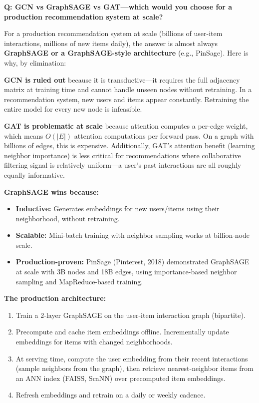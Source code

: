 \begin{interviewq}
\textbf{Q: GCN vs GraphSAGE vs GAT---which would you choose for a production recommendation system at scale?}

 \quad {} \quad \badgefreq{\freqmed}

\stronganswer

For a production recommendation system at scale (billions of user-item interactions, millions of new items daily), the answer is almost always \textbf{GraphSAGE or a GraphSAGE-style architecture} (e.g., PinSage). Here is why, by elimination:

\textbf{GCN is ruled out} because it is transductive---it requires the full adjacency matrix at training time and cannot handle unseen nodes without retraining. In a recommendation system, new users and items appear constantly. Retraining the entire model for every new node is infeasible.

\textbf{GAT is problematic at scale} because attention computes a per-edge weight, which means $O(|E|)$ attention computations per forward pass. On a graph with billions of edges, this is expensive. Additionally, GAT's attention benefit (learning neighbor importance) is less critical for recommendations where collaborative filtering signal is relatively uniform---a user's past interactions are all roughly equally informative.

\textbf{GraphSAGE wins because:}
\begin{itemize}
    \item \textbf{Inductive:} Generates embeddings for new users/items using their neighborhood, without retraining.
    \item \textbf{Scalable:} Mini-batch training with neighbor sampling works at billion-node scale.
    \item \textbf{Production-proven:} PinSage (Pinterest, 2018) demonstrated GraphSAGE at scale with 3B nodes and 18B edges, using importance-based neighbor sampling and MapReduce-based training.
\end{itemize}

\textbf{The production architecture:}
\begin{enumerate}
    \item Train a 2-layer GraphSAGE on the user-item interaction graph (bipartite).
    \item Precompute and cache item embeddings offline. Incrementally update embeddings for items with changed neighborhoods.
    \item At serving time, compute the user embedding from their recent interactions (sample neighbors from the graph), then retrieve nearest-neighbor items from an ANN index (FAISS, ScaNN) over precomputed item embeddings.
    \item Refresh embeddings and retrain on a daily or weekly cadence.
\end{enumerate}


\end{interviewq}
